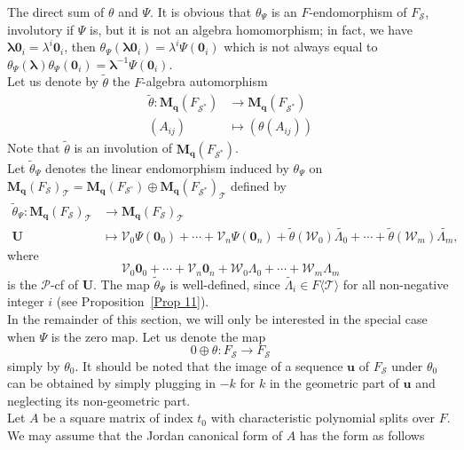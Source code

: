 \documentclass[12pt]{amsart}
\theoremstyle{definition}
\numberwithin{equation}{section}
\numberwithin{equation}{section}
\begin{document}
The direct sum of $\theta$ and $\Psi$. It is obvious that $\theta_{\Psi}$ is an $F$-endomorphism of $F_{\mathcal{S}}$, involutory if $\Psi$ is, but it is not an algebra homomorphism; in fact, we have $\pmb{\lambda}\pmb{0}_{i}=\lambda^{i}\pmb{0}_{i}$, then $\theta_{\Psi}(\pmb{\lambda}\pmb{0}_{i})=\lambda^{i}\Psi(\pmb{0}_{i})$ which is not always equal to $\theta_{\Psi}(\pmb{\lambda})\theta_{\Psi}(\pmb{0}_{i})=\pmb{\lambda}^{-1}\Psi(\pmb{0}_{i})$.
\\Let us denote by $\widetilde{\theta}$ the $F$-algebra automorphism
\begin{align*}
\widetilde{\theta}: \mathbf{M_{q}}(F_{\mathcal{S}^{\ast}}) &\longrightarrow \mathbf{M_{q}}(F_{\mathcal{S}^{\ast}})\\
(A_{ij}) &\longmapsto (\theta(A_{ij}))
\end{align*}
Note that $\widetilde{\theta}$ is an involution of $\mathbf{M_{q}}(F_{\mathcal{S}^{\ast}})$.
\\Let $\widetilde{\theta}_{\Psi}$ denotes the linear endomorphism induced by $\theta_{\Psi}$ on $\mathbf{M_{q}}(F_{\mathcal{S}})_{\mathcal{T}}=
\mathbf{M_{q}}(F_{\mathcal{S}^{\circ}})\oplus\mathbf{M_{q}}(F_{\mathcal{S}^{\ast}})_{\mathcal{T}}$ defined by
\begin{align*}
\widetilde{\theta}_{\Psi}: \mathbf{M_{q}}(F_{\mathcal{S}})_{\mathcal{T}} &\longrightarrow \mathbf{M_{q}}(F_{\mathcal{S}})_{\mathcal{T}}\\
\pmb{U} &\longmapsto \mathcal{V}_{0}\Psi(\pmb{0}_{0})+\cdots+\mathcal{V}_{n}\Psi(\pmb{0}_{n})+
\widetilde{\theta}(\mathcal{W}_{0})\widetilde{\Lambda_{0}}+\cdots+\widetilde{\theta}(\mathcal{W}_{m})\widetilde{\Lambda_{m}},
\end{align*}
where $$\mathcal{V}_{0}\pmb{0}_{0}+\cdots+\mathcal{V}_{n}\pmb{0}_{n}+\mathcal{W}_{0}\Lambda_{0}+\cdots+\mathcal{W}_{m}\Lambda_{m}$$
is the $\mathcal{P}$-cf of $\pmb{U}$. The map $\widetilde{\theta}_{\Psi}$ is well-defined, since $\widetilde{\Lambda_{i}}\in F\langle\mathcal{T}\rangle$ for all non-negative integer $i$ (see Proposition~\ref{Prop 11}).
\\In the remainder of this section, we will only be interested in the special case when $\Psi$ is the zero map. Let us denote  the map $$0\oplus \theta: F_{\mathcal{S}} \longrightarrow F_{\mathcal{S}}$$
simply by $\theta_{0}$. It should be noted that the image of a sequence $\pmb{u}$ of $F_{\mathcal{S}}$ under $\theta_{0}$ can be obtained by simply plugging in $-k$ for $k$ in the geometric part of $\pmb{u}$ and neglecting its non-geometric part.
\\Let $A$ be a square matrix of index $t_{0}$ with characteristic polynomial splits over $F$. We may assume that the Jordan canonical form of $A$ has the form as follows
\end{document}
